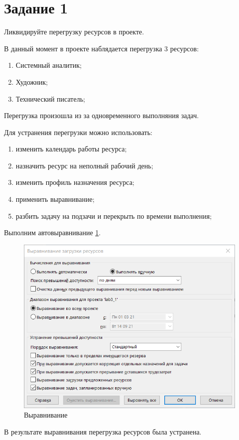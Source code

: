 \section{Задание 1}

Ликвидируйте перегрузку ресурсов в проекте.

В данный момент в проекте наблядается перегрузка 3 ресурсов:
\begin{enumerate}
	\item Системный аналитик;
	\item Художник;
	\item Технический писатель;
\end{enumerate}

Перегрузка произошла из за одновременного выполняния задач.

Для устранения перегрузки можно использовать:
\begin{enumerate}
	\item изменить календарь работы ресурса;
	\item назначить ресурс на неполный рабочий день;
	\item изменить профиль назначения ресурса;
	\item применить выравнивание;
	\item разбить задачу на подзачи и перекрыть по времени выполнения;
\end{enumerate}

Выполним автовыравнивание \ref{fig:lab311}.
\begin{figure}[H]
	\centering
	\includegraphics[width=0.7\linewidth]{src/lab3_1_1}
	\caption{Выравнивание}
	\label{fig:lab311}
\end{figure}

В результате выравнивания перегрузка ресурсов была устранена.

